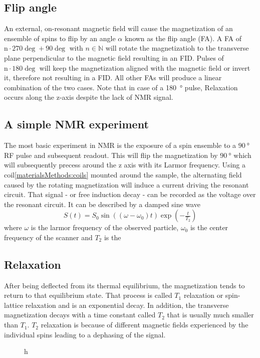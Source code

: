         \subsection{Flip angle}
        An external, on-resonant magnetic field will cause the magnetization of an ensemble of spins to flip by an angle $\alpha$ known as the flip angle (FA). A FA of $\mathrm n\cdot 270 \deg + 90 \deg$ with $n \in \mathbb{N}$ will rotate the magnetizatioh to the transverse plane perpendicular to the magnetic field resulting in an FID. Pulses of $\mathrm n\cdot 180 \deg$ will keep the magnetization aligned with the magnetic field or invert it, therefore not resulting in a FID. All other FAs will produce a linear combination of the two cases. Note that in case of a \SI{180}{\degree} pulse, Relaxation occurs along the z-axis despite the lack of NMR signal.
        \subsection{A simple NMR experiment}
        The most basic experiment in NMR is the exposure of a spin ensemble to a $\SI{90}{\degree}$ RF pulse and subsequent readout. This will flip the magnetization by $\SI{90}{\degree}$ which will subsequently precess around the z axis with its Larmor frequency. Using a coil\ref{materialsMethods:coils} mounted around the sample, the alternating field caused by the rotating magnetization will induce a current driving the resonant circuit. That signal - or free induction decay - can be recorded as the voltage over the resonant circuit. It can be described by a damped sine wave
        \begin{equation}
            S(t) = S_0 \sin((\omega - \omega_0)  t ) \exp(-\tfrac{t}{T_2})
        \end{equation}
        where $\omega$ is the larmor frequency of the observed particle, $\omega_0$ is the center frequency of the scanner and $T_2$ is the 
        \subsection{Relaxation}
        After being deflected from its thermal equilibrium, the magnetization tends to return to
        that equilibrium state. That process is called $T_1$ relaxation or spin-lattice relaxation
        and is an exponential decay. In addition, the transverse magnetization decays with a time
        constant called $T_2$ that is usually much smaller than $T_1$. $T_2$ relaxation is because
        of different magnetic fields experienced by the individual spins leading to a dephasing of
        the signal.
        \begin{figure}{h}
        \end{figure}
